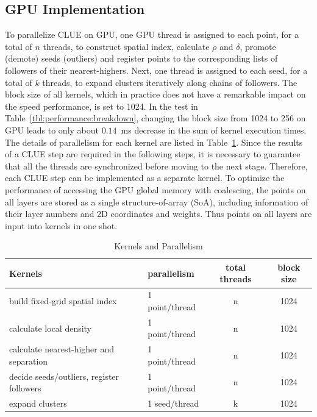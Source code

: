 \subsection{GPU Implementation}
\label{sec:implementation}

 To parallelize CLUE on GPU, one GPU thread is assigned to each point, for a total of $n$ threads, to construct spatial index, calculate $\rho$ and $\delta$, promote (demote) seeds (outliers) and register points to the corresponding lists of followers of their nearest-highers. Next, one thread is assigned to each seed, for a total of $k$ threads, to expand clusters iteratively along chains of followers. The block size of all kernels, which in practice does not have a remarkable impact on the speed performance, is set to 1024. In the test in Table~\ref{tbl:performance:breakdown}, changing the block size from 1024 to 256 on GPU leads to only about $0.14$~ms decrease in the sum of kernel execution times. The details of parallelism for each kernel are listed in Table~\ref{tbl:implementation:parallelism}. Since the results of a CLUE step are required in the following steps, it is necessary to guarantee that all the threads are synchronized before moving to the next stage. Therefore, each CLUE step can be implemented as a separate kernel. To optimize the performance of accessing the GPU global memory with coalescing, the points on all layers are stored as a single structure-of-array (SoA), including information of their layer numbers and 2D coordinates and weights. Thus points on all layers are input into kernels in one shot.


\begin{table}[t]
    \renewcommand{\arraystretch}{1.25}
    \centering
    \begin{tabular}{l|l|c|c}
        \hline
        Kernels                                  & parallelism    & total threads & block size \\
        \hline
        build fixed-grid spatial index           & 1 point/thread & n             & 1024 \\
        calculate local density                  & 1 point/thread & n             & 1024 \\
        calculate nearest-higher and separation  & 1 point/thread & n             & 1024 \\
        decide seeds/outliers, register followers& 1 point/thread & n             & 1024 \\
        expand clusters                          & 1 seed/thread  & k             & 1024 \\
        \hline
    \end{tabular} 
    \caption{Kernels and Parallelism}
    \label{tbl:implementation:parallelism}
\end{table}


